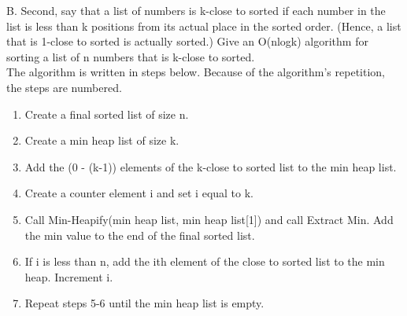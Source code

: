 \documentclass[11pt, solution, letterpaper]{format}
\begin{document}
\clearpage
B. Second, say that
a list of numbers is k-close to sorted if each number in the list is less than k positions from its actual place in
the sorted order. (Hence, a list that is 1-close to sorted is actually sorted.) Give an O(nlogk) algorithm for
sorting a list of n numbers that is k-close to sorted.\\
The algorithm is written in steps below. Because of the algorithm's repetition, the steps are numbered.
\begin{enumerate}
\item Create a final sorted list of size n. \vspace{-3mm}
\item Create a min heap list of size k. \vspace{-3mm}
\item Add the (0 - (k-1)) elements of the k-close to sorted list to the min heap list. \vspace{-3mm}
\item Create a counter element i and set i equal to k.\vspace{-3mm}
\item Call Min-Heapify(min heap list, min heap list[1]) and call Extract Min. Add the min value to the end of the final sorted list. \vspace{-3mm}
\item If i is less than n, add the ith element of the close to sorted list to the min heap. Increment i.\vspace{-3mm}
\item Repeat steps 5-6 until the min heap list is empty. \\
   
\end{enumerate}
\end{document}
